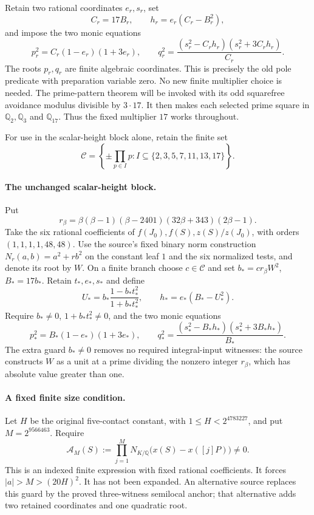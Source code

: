 \documentclass[11pt]{article}
\theoremstyle{definition}
\begin{document}
Retain two rational coordinates $e_r,s_r$, set
\[
 C_r=17B_r,\qquad h_r=e_r(C_r-B_r^2),
\]
and impose the two monic equations
\[
 p_r^2=C_r(1-e_r)(1+3e_r),\qquad
 q_r^2=\frac{(s_r^2-C_rh_r)(s_r^2+3C_rh_r)}{C_r}.
\]
The roots $p_r,q_r$ are finite algebraic coordinates. This is precisely
the old pole predicate with preparation variable zero. No new finite
multiplier choice is needed. The prime-pattern theorem will be invoked
with its odd squarefree avoidance modulus divisible by $3\cdot17$.
It then makes each selected prime square in $\mathbb Q_2,\mathbb Q_3$
and $\mathbb Q_{17}$. Thus the fixed multiplier $17$ works throughout.

For use in the scalar-height block alone, retain the finite set
\[
 \mathcal C=\left\{\pm\prod_{p\in I}p:
 I\subseteq\{2,3,5,7,11,13,17\}\right\}.
\]

\paragraph{The unchanged scalar-height block.}
Put
\[
 r_\beta=\beta(\beta-1)(\beta-2401)(32\beta+343)(2\beta-1).
\]
Take the six rational coefficients of
$f(J_0),f(S),z(S)/z(J_0)$, with orders $(1,1,1,1,48,48)$.
Use the source's fixed binary norm construction $N_r(a,b)=a^2+rb^2$
on the constant leaf $1$ and the six normalized tests, and denote its
root by $W$. On a finite branch choose $c\in\mathcal C$ and set
$b_*=cr_\beta W^2$, $B_*=17b_*$. Retain $t_*,e_*,s_*$ and define
\[
 U_* =b_*\frac{1-b_*t_*^2}{1+b_*t_*^2},\qquad
 h_*=e_*(B_*-U_*^2).
\]
Require $b_*\ne0$, $1+b_*t_*^2\ne0$, and the two monic equations
\[
 p_*^2=B_*(1-e_*)(1+3e_*),\qquad
 q_*^2=\frac{(s_*^2-B_*h_*)(s_*^2+3B_*h_*)}{B_*}.
\]
The extra guard $b_*\ne0$ removes no required integral-input witnesses:
the source constructs $W$ as a unit at a prime dividing the nonzero
integer $r_\beta$, which has absolute value greater than one.

\paragraph{A fixed finite size condition.}
Let $H$ be the original five-contact constant, with
$1\le H<2^{4783227}$, and put $M=2^{9566463}$. Require
\[
 \mathcal A_M(S):=\prod_{j=1}^M
 N_{K/\mathbb Q}\bigl(x(S)-x([j]P)\bigr)\ne0.
\]
This is an indexed finite expression with fixed rational coefficients.
It forces $|a|>M>(20H)^2$. It has not been expanded. An alternative
source replaces this guard by the proved three-witness semilocal anchor;
that alternative adds two retained coordinates and one quadratic root.
\end{document}
